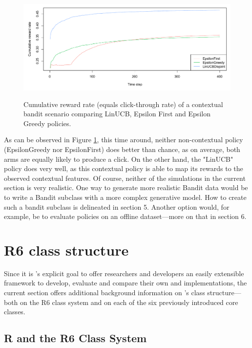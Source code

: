 \documentclass{jss}\usepackage[]{graphicx}\usepackage[]{color}
\begin{document}
\begin{figure}[H]
\centering
\includegraphics[width=.99\textwidth]{fig/simple_two}
\label{fig:simple_two}
\caption{Cumulative reward rate (equals click-through rate) of a contextual bandit scenario comparing LinUCB, Epsilon First and Epsilon Greedy policies.}
\end{figure}

As can be observed in Figure \ref{fig:simple_two}, this time around, neither non-contextual policy (EpsilonGreedy nor EpsilonFirst) does better than chance, as on average, both arms are equally likely to produce a click. On the other hand, the "LinUCB" policy does very well, as this contextual policy is able to map its rewards to the observed contextual features. Of course, neither of the simulations in the current section is very realistic. One way to generate more realistic Bandit data would be to write a Bandit subclass with a more complex generative model. How to create such a bandit subclass is delineated in section 5. Another option would, for example, be to evaluate policies on an offline dataset---more on that in section 6.

\section{R6 class structure}

Since it is 's explicit goal to offer researchers and developers an easily extensible framework to develop, evaluate and compare their own  and  implementations, the current section offers additional background information on 's class structure---both on the R6 class system \cite{R6} and on each of the six previously introduced core  classes.

\subsection{R and the R6 Class System}
\end{document}
